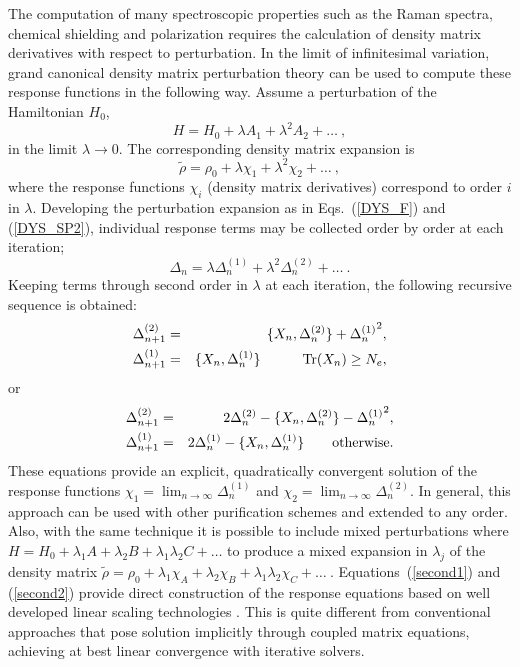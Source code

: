 The computation of many spectroscopic properties such as the Raman spectra, 
chemical shielding and polarization requires the calculation of density 
matrix derivatives with respect to perturbation.
In the limit of infinitesimal variation, grand canonical density matrix perturbation 
theory can be used to compute these response functions in the following way.
Assume a perturbation of the Hamiltonian $H_0$,
\begin{equation}
H = H_0 + \lambda A_1 + \lambda^2 A_2 + \ldots~,
\end{equation}
in the limit $\lambda \rightarrow 0$.  
The corresponding density matrix expansion is
\begin{equation}
{\widetilde \rho} = \rho_0 + \lambda \chi_1 + \lambda^2 \chi_2 + \ldots~,
\end{equation}
where the response functions $\chi_i$ (density matrix derivatives) correspond 
to order $i$ in $\lambda$.  Developing the perturbation expansion as in 
Eqs.\ (\ref{DYS_F}) and (\ref{DYS_SP2}), individual response terms may be collected
order by order at each iteration;
\begin{equation}
\Delta_n = \lambda \Delta^{(1)}_n + \lambda^2 \Delta^{(2)}_n + \ldots~.
\end{equation}
Keeping terms through second order in $\lambda$ at each iteration, 
the following recursive sequence is obtained:
\begin{eqnarray}\label{second1}
\Delta^{(2)}_{n+1} &=& \{ X_n,\Delta^{(2)}_n\} + {\Delta^{(1)}_n}^2,  \\
\Delta^{(1)}_{n+1} &=& \{ X_n,\Delta^{(1)}_n\} \quad\qquad {\rm Tr}(X_n) \geq N_e,  \nonumber
\end{eqnarray}
or
\begin{eqnarray}\label{second2}
\Delta^{(2)}_{n+1} &=& 2\Delta^{(2)}_n - \{ X_n,\Delta^{(2)}_n\} - {\Delta^{(1)}_n}^2, \\
\Delta^{(1)}_{n+1} &=& 2\Delta^{(1)}_n - \{ X_n,\Delta^{(1)}_n\} \qquad {\rm otherwise}.\nonumber
\end{eqnarray}
These equations provide an explicit, quadratically convergent solution of the response functions 
$\chi_1 = \lim_{n \rightarrow \infty} \Delta^{(1)}_n$ and $\chi_2 = \lim_{n \rightarrow \infty} 

\Delta^{(2)}_n$.  In general, this approach can be used with other purification schemes and 
extended to any order.  Also, with the same technique it is possible
to include mixed perturbations where $H = H_0 + \lambda_1 A+\lambda_2 B+ \lambda_1 \lambda_2 C + \ldots$
to produce a mixed expansion in $\lambda_j$ of the density matrix
${\widetilde \rho} = \rho_0 + \lambda_1 \chi_A + \lambda_2 \chi_B + \lambda_1 \lambda_2 \chi_C + \ldots~$.
Equations~(\ref{second1}) and (\ref{second2}) provide direct construction of the response 
equations based on well developed linear scaling technologies \cite{NiklassonSP2,NiklassonSP4}.  
This is quite different from conventional approaches\cite{Frisch,Dupuis,Ochsenfeld,Larsen}  
that pose solution implicitly through coupled matrix 
equations, achieving at best linear convergence with iterative solvers.

